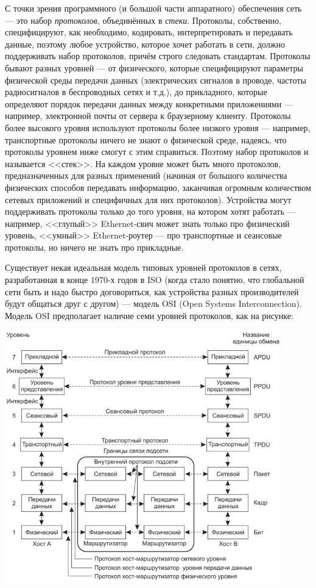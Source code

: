 \documentclass{../../text-style}
\begin{document}
С точки зрения программного (и большой части аппаратного) обеспечения сеть --- это набор \textit{протоколов}, объединённых в \textit{стеки}. Протоколы, собственно, специфицируют, как необходимо, кодировать, интерпретировать и передавать данные, поэтому любое устройство, которое хочет работать в сети, должно поддерживать набор протоколов, причём строго следовать стандартам. Протоколы бывают разных уровней --- от физического, которые специфицируют параметры физической среды передачи данных (электрических сигналов в проводе, частоты радиосигналов в беспроводных сетях и т.д.), до прикладного, которые определяют порядок передачи данных между конкретными приложениями --- например, электронной почты от сервера к браузерному клиенту. Протоколы более высокого уровня используют протоколы более низкого уровня --- например, транспортные протоколы ничего не знают о физической среде, надеясь, что протоколы уровнем ниже смогут с этим справиться. Поэтому набор протоколов и называется <<стек>>. На каждом уровне может быть много протоколов, предназначенных для разных применений (начиная от большого количества физических способов передавать информацию, заканчивая огромным количеством сетевых приложений и специфичных для них протоколов). Устройства могут поддерживать протоколы только до того уровня, на котором хотят работать --- например, <<глупый>> Ethernet-свич может знать только про физический уровень, <<умный>> Ethernet-роутер --- про транспортные и сеансовые протоколы, но ничего не знать про прикладные.

Существует некая идеальная модель типовых уровней протоколов в сетях, разработанная в конце 1970-х годов в ISO (когда стало понятно, что глобальной сети быть и надо быстро договориться, как устройства разных производителей будут общаться друг с другом) --- модель OSI (Open Systems Interconnection). Модель OSI предполагает наличие семи уровней протоколов, как на рисунке:

\begin{center}
    \includegraphics[width=0.9\textwidth]{osiStack.png}
\end{center}
\end{document}
